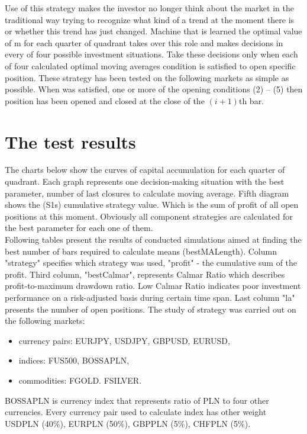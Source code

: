 \documentclass{tewiart}
\begin{document}
\indent Use of this strategy makes the investor no longer think about the market in the traditional way trying to recognize what kind of a trend at the moment there is or whether this trend has just changed. Machine that is learned the optimal value of m for each quarter of quadrant takes over this role and makes decisions in every of four possible investment situations. Take these decisions only when each of four calculated optimal moving averages condition is satisfied to open specific position.
These strategy has been tested on the following markets as simple as possible. When was satisfied, one or more of the opening conditions (2) – (5) then position has been opened and closed at the close of the $(i +1)$th bar.





\section{The test results}
\indent The charts below show the curves of capital accumulation for each quarter of quadrant. Each graph represents one decision-making situation with the best parameter, number of last closures to calculate moving average. Fifth diagram shows the (S1s) cumulative strategy value. Which is the sum of profit of all open positions at this moment. Obviously all component strategies are calculated for the best parameter for each one of them.\\
\indent Following tables present the results of conducted simulations aimed at finding the best number of bars required to calculate means (bestMALength). Column "strategy" specifies which strategy was used, "profit" - the cumulative sum of the profit. Third column, "bestCalmar", represents Calmar Ratio which describes profit-to-maximum drawdown ratio. Low Calmar Ratio indicates poor investment performance on a risk-adjusted basis during certain time span. Last column "la" presents the number of open positions.
The study of strategy was carried out on the following markets:
\begin{itemize}
\item currency pairs: EURJPY, USDJPY, GBPUSD, EURUSD,
\item indices: FUS500, BOSSAPLN,
\item commodities: FGOLD. FSILVER.
\end{itemize}
BOSSAPLN is currency index that represents ratio of PLN to four other currencies. Every currency pair used to calculate index has other weight USDPLN (40\%), EURPLN (50\%), GBPPLN (5\%), CHFPLN (5\%).
\end{document}
